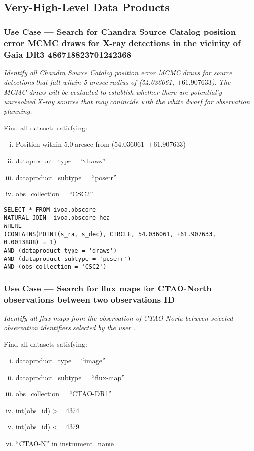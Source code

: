 

\subsection{Very-High-Level Data Products}

\subsubsection{Use Case --- Search for Chandra Source Catalog position error MCMC draws for X-ray detections in the vicinity of Gaia DR3 486718823701242368}

{\em Identify all Chandra Source Catalog position error MCMC draws for source detections that fall within 5 arcsec radius of  (54.036061, $+61.907633$).  The MCMC draws will be evaluated to establish whether there are potentially unresolved X-ray sources that may conincide with the white dwarf for observation planning.\/}

\medskip
\noindent Find all datasets satisfying:
\begin{enumerate}[(i)]
  \item Position within 5.0 arcsec from (54.036061, $+61.907633$)
  \item dataproduct\_type = ``draws''
  \item dataproduct\_subtype = ``poserr''
  \item obs\_collection = ``CSC2''
\end{enumerate}

\begin{verbatim}
SELECT * FROM ivoa.obscore
NATURAL JOIN  ivoa.obscore_hea
WHERE
(CONTAINS(POINT(s_ra, s_dec), CIRCLE, 54.036061, +61.907633, 0.0013888) = 1)
AND (dataproduct_type = 'draws')
AND (dataproduct_subtype = 'poserr')
AND (obs_collection = 'CSC2')
\end{verbatim}


\subsubsection{Use Case --- Search for flux maps for CTAO-North observations between two observations ID}

{\em Identify all flux maps from the observation of CTAO-North between selected observation identifiers selected by the user .\/}

\medskip
\noindent Find all datasets satisfying:
\begin{enumerate}[(i)]
  \item dataproduct\_type = ``image''
  \item dataproduct\_subtype = ``flux-map''
  \item obs\_collection = ``CTAO-DR1''
  \item int(obs\_id) >= 4374
  \item int(obs\_id) <= 4379
  \item ``CTAO-N'' in instrument\_name
\end{enumerate}

